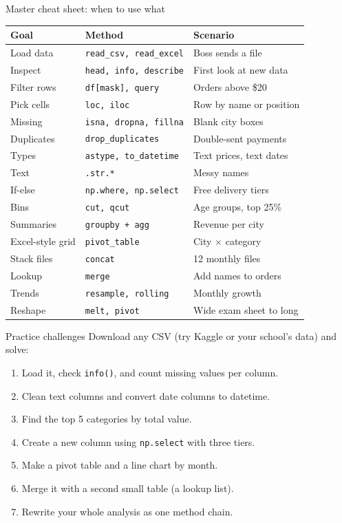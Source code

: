 \documentclass[aspectratio=169,10pt]{beamer}
\newcommand{\code}[1]{\texttt{#1}}
\begin{document}
\begin{frame}{Master cheat sheet: when to use what}
  \scriptsize
  \renewcommand{\arraystretch}{1.15}
  \begin{tabular}{p{3.4cm}p{4.0cm}p{4.2cm}}
    \toprule
    \textbf{Goal} & \textbf{Method} & \textbf{Scenario}\\
    \midrule
    Load data & \code{read\_csv, read\_excel} & Boss sends a file\\
    Inspect & \code{head, info, describe} & First look at new data\\
    Filter rows & \code{df[mask], query} & Orders above \$20\\
    Pick cells & \code{loc, iloc} & Row by name or position\\
    Missing & \code{isna, dropna, fillna} & Blank city boxes\\
    Duplicates & \code{drop\_duplicates} & Double-sent payments\\
    Types & \code{astype, to\_datetime} & Text prices, text dates\\
    Text & \code{.str.*} & Messy names\\
    If-else & \code{np.where, np.select} & Free delivery tiers\\
    Bins & \code{cut, qcut} & Age groups, top 25\%\\
    Summaries & \code{groupby + agg} & Revenue per city\\
    Excel-style grid & \code{pivot\_table} & City $\times$ category\\
    Stack files & \code{concat} & 12 monthly files\\
    Lookup & \code{merge} & Add names to orders\\
    Trends & \code{resample, rolling} & Monthly growth\\
    Reshape & \code{melt, pivot} & Wide exam sheet to long\\
    \bottomrule
  \end{tabular}
\end{frame}

\begin{frame}{Practice challenges}
  Download any CSV (try Kaggle or your school's data) and solve:
  \begin{enumerate}
    \item Load it, check \code{info()}, and count missing values per column.
    \item Clean text columns and convert date columns to datetime.
    \item Find the top 5 categories by total value.
    \item Create a new column using \code{np.select} with three tiers.
    \item Make a pivot table and a line chart by month.
    \item Merge it with a second small table (a lookup list).
    \item Rewrite your whole analysis as one \alert{method chain}.
  \end{enumerate}
\end{frame}
\end{document}
